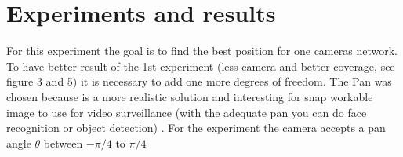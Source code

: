 \graphicspath{ {./content/exp/figure/} }

\section{Experiments and results}\label{sec:4}


For this experiment the goal is to find the best position for one cameras network. To have better result of the 1st experiment (less camera and better coverage, see figure 3 and 5) it is necessary to add one more degrees of freedom. The Pan was chosen because is a more realistic solution and interesting for snap workable image to use for video surveillance (with the adequate pan you can do face recognition \cite{an2012face} or object detection)\cite{parupati2011collaborative} .
 For the experiment the camera accepts a pan angle $\theta$ between $-\pi/4$  to  $\pi/4$ 

